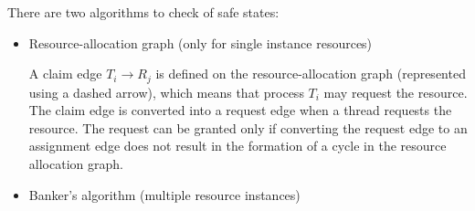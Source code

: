 There are two algorithms to check of safe states:
\begin{itemize}
    \item Resource-allocation graph (only for single instance resources)
    
    A claim edge $T_i \rightarrow R_j$ is defined on the resource-allocation graph (represented using a dashed arrow), which means that process $T_i$ may request the resource. The claim edge is converted into a request edge when a thread requests the resource. The request can be granted only if converting the request edge
    to an assignment edge does not result in the formation of a cycle in the resource allocation graph.
    \item Banker's algorithm (multiple resource instances)
\end{itemize}